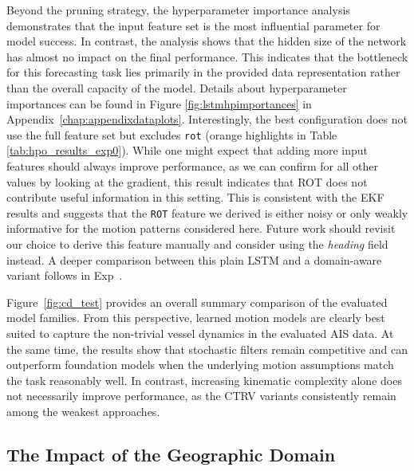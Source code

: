 Beyond the pruning strategy, the hyperparameter importance analysis demonstrates that the input feature set is the most influential parameter for model success.  
In contrast, the analysis shows that the hidden size of the network has almost no impact on the final performance.
This indicates that the bottleneck for this forecasting task lies primarily in the provided data representation rather than the overall capacity of the model.
Details about hyperparameter importances can be found in Figure \ref{fig:lstmhpimportances} in Appendix~\ref{chap:appendixdataplots}.
Interestingly, the best configuration does not use the full feature set but excludes \texttt{rot} (orange highlights in Table \ref{tab:hpo_results_exp0}).
While one might expect that adding more input features should always improve performance, as we can confirm for all other values by looking at the gradient, this result indicates that \ac{ROT} does not contribute useful information in this setting.
This is consistent with the \ac{EKF} results and suggests that the \texttt{\ac{ROT}} feature we derived is either noisy or only weakly informative for the motion patterns considered here.
Future work should revisit our choice to derive this feature manually and consider using the \textit{heading} field instead.
A deeper comparison between this plain \ac{LSTM} and a domain-aware variant follows in Exp~. %

Figure~\ref{fig:cd_test} provides an overall summary comparison of the evaluated model families.
From this perspective, learned motion models are clearly best suited to capture the non-trivial vessel dynamics in the evaluated AIS data.
At the same time, the results show that stochastic filters remain competitive and can outperform foundation models when the underlying motion assumptions match the task reasonably well.
In contrast, increasing kinematic complexity alone does not necessarily improve performance, as the CTRV variants consistently remain among the weakest approaches.







\subsection*{The Impact of the Geographic Domain} %
